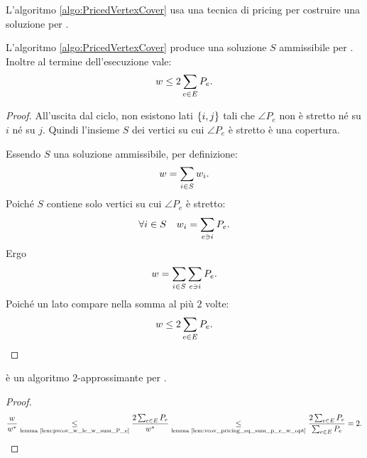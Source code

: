 L'algoritmo \ref{algo:PricedVertexCover} usa una tecnica di pricing per costruire una soluzione per \VertexCover.
\begin{algorithm}
	\caption{\PricedVertexCover}
	\label{algo:PricedVertexCover}
	
\end{algorithm}

\begin{lemma}\label{lem:pvcov_w_le_w_sum_P_e}
	L'algoritmo \ref{algo:PricedVertexCover} produce una soluzione $S$ ammissibile per \VertexCover. Inoltre al termine dell'esecuzione vale:
	\begin{equation*}
		w \leq 2 \sum_{e \in E} P_e \text.
	\end{equation*}
\end{lemma}
\begin{proof}
	All'uscita dal ciclo, non esistono lati $\set{i,j}$ tali che $\angle{P_e}$ non è stretto né su $i$ né su $j$.
	Quindi l'insieme $S$ dei vertici su cui $\angle{P_e}$ è stretto è una copertura.

	Essendo $S$ una soluzione ammissibile, per definizione:
	\begin{equation*}
		w = \sum_{i\in S} w_i \text.
	\end{equation*}
	Poiché $S$ contiene solo vertici su cui $\angle{P_e}$ è stretto:
	\begin{equation*}
		\forall i\in S \quad w_i = \sum_{e\ni i} P_e \text.
	\end{equation*}
	Ergo
	\begin{equation*}
		w = \sum_{i\in S} \sum_{e\ni i} P_e \text.
	\end{equation*}
	Poiché un lato compare nella somma al più $2$ volte:
	\begin{equation*}
		w \leq 2 \sum_{e\in E} P_e \text.
	\end{equation*}
\end{proof}

\begin{theorem}
	\PricedVertexCover è un algoritmo $2$-approssimante per \VertexCover.
\end{theorem}
\begin{proof}
	\begin{equation*}
		\frac{w}{w\star} \underset{\text{lemma \ref{lem:pvcov_w_le_w_sum_P_e}}}{\leq}
		\frac{2\sum_{e\in E} P_e}{w\star} \underset{\text{lemma \ref{lem:vcov_pricing_eq_sum_p_e_w_opt}}}{\leq}
		\frac{2\sum_{e\in E} P_e}{\sum_{e\in E} P_e} = 2 \text.
	\end{equation*}
\end{proof}


